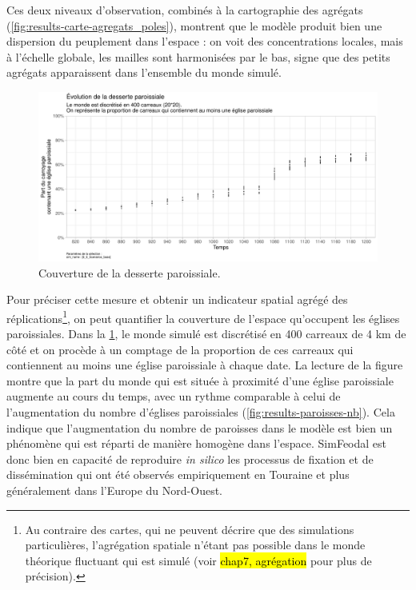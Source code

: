 Ces deux niveaux d'observation, combinés à la cartographie des agrégats (\cref{fig:results-carte-agregats_poles}), montrent que le modèle produit bien une dispersion du peuplement dans l'espace : on voit des concentrations locales, mais à l'échelle globale, les mailles sont harmonisées par le bas, signe que des petits agrégats apparaissent dans l'ensemble du monde simulé.

\begin{figure}[H]
	\centering
	\includegraphics[width=\linewidth]{img/results_6_6/Paroisses_Desserte_Haut.pdf}
	\caption{Couverture de la desserte paroissiale.}
	\label{fig:results-paroisses-desserte}
\end{figure}

Pour préciser cette mesure et obtenir un indicateur spatial agrégé des réplications\footnote{
	Au contraire des cartes, qui ne peuvent décrire que des simulations particulières, l'agrégation spatiale n'étant pas possible dans le monde théorique fluctuant qui est simulé (voir \hl{chap7, agrégation} pour plus de précision).
}, on peut quantifier la couverture de l'espace qu'occupent les églises paroissiales.
Dans la \cref{fig:results-paroisses-desserte}, le monde simulé est discrétisé en 400 carreaux de 4 km de côté et on procède à un comptage de la proportion de ces carreaux qui contiennent au moins une église paroissiale à chaque date.
La lecture de la figure montre que la part du monde qui est située à proximité d'une église paroissiale augmente au cours du temps, avec un rythme comparable à celui de l'augmentation du nombre d'églises paroissiales (\cref{fig:results-paroisses-nb}).
Cela indique que l'augmentation du nombre de paroisses dans le modèle est bien un phénomène qui est réparti de manière homogène dans l'espace.
SimFeodal est donc bien en capacité de reproduire \textit{in silico} les processus de fixation et de dissémination qui ont été observés empiriquement en Touraine et plus généralement dans l'Europe du Nord-Ouest.



